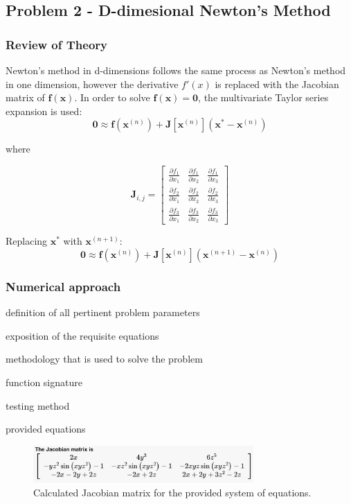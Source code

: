 \documentclass[10pt]{article}
\begin{document}
\subsection*{Problem 2 - D-dimesional Newton's Method}

\subsubsection*{Review of Theory}
Newton's method in d-dimensions follows the same process as Newton's method in one dimension, however 
the derivative $f'(x)$ is replaced with the Jacobian matrix of $\mathbf{f}(\mathbf{x})$. In order to 
solve $\mathbf{f}(\mathbf{x})=\mathbf{0}$, the multivariate Taylor series expansion is used:
$$\mathbf{0} \approx \mathbf{f}(\mathbf{x}^{(n)}) + \mathbf{J}[\mathbf{x}^{(n)}](\mathbf{x}^* -
\mathbf{x}^{(n)})$$

where

\[
\mathbf{J}_{i,j} =
\begin{bmatrix}
  \frac{\partial f_1}{\partial x_1} & 
    \frac{\partial f_1}{\partial x_2} & 
    \frac{\partial f_1}{\partial x_3} \\[1ex] %
  \frac{\partial f_2}{\partial x_1} & 
    \frac{\partial f_2}{\partial x_2} & 
    \frac{\partial f_2}{\partial x_3} \\[1ex]
  \frac{\partial f_3}{\partial x_1} & 
    \frac{\partial f_3}{\partial x_2} & 
    \frac{\partial f_3}{\partial x_3}
\end{bmatrix}
\]

Replacing $\mathbf{x}^*$ with $\mathbf{x}^{(n+1)}$:
$$\mathbf{0} \approx \mathbf{f}(\mathbf{x}^{(n)}) + \mathbf{J}[\mathbf{x}^{(n)}](\mathbf{x}^{(n+1)} -
\mathbf{x}^{(n)})$$



\subsubsection*{Numerical approach}

definition of all pertinent problem parameters

exposition of the requisite equations

methodology that is used to solve the problem

function signature 

testing method 

provided equations

\begin{figure}[h!]
\centering
\includegraphics[width=0.75\textwidth]{Jacobian.png}
\caption{Calculated Jacobian matrix for the provided system of equations.}
\end{figure}
\end{document}
